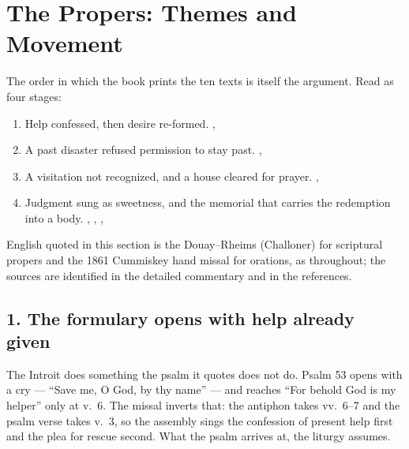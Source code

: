 \sectionguard
\section*{The Propers: Themes and Movement}
\label{triptych:brief-synthesis:start}


The order in which the book prints the ten texts is itself the argument. Read
as four stages:

\begin{enumerate}[leftmargin=1.5em, itemsep=0.1em]
  \item Help confessed, then desire re-formed. , 
  \item A past disaster refused permission to stay past. , 
  \item A visitation not recognized, and a house cleared for prayer. , 
  \item Judgment sung as sweetness, and the memorial that carries the redemption into a body. , , , 
\end{enumerate}

English quoted in this section is the Douay--Rheims (Challoner) for scriptural
propers and the 1861 Cummiskey hand missal for orations, as throughout;
the sources are identified in the detailed commentary and in the references.

\subsection*{1. The formulary opens with help already given}

The Introit does something the psalm it quotes does not do. Psalm 53 opens
with a cry --- ``Save me, O God, by thy name'' --- and reaches ``For behold
God is my helper'' only at v.~6. The missal inverts that: the antiphon takes
vv.~6--7 and the psalm verse takes v.~3, so the assembly sings the confession
of present help first and the plea for rescue second. What the psalm arrives
at, the liturgy assumes.

